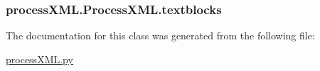 \subsubsection[{textblocks}]{\setlength{\rightskip}{0pt plus 5cm}process\+X\+M\+L.\+Process\+X\+M\+L.\+textblocks}\label{classprocess_x_m_l_1_1_process_x_m_l_aef1a420c84937ecbe7eb76e5c99445f8}


The documentation for this class was generated from the following file\+:\begin{DoxyCompactItemize}
\item 
\hyperlink{process_x_m_l_8py}{process\+X\+M\+L.\+py}\end{DoxyCompactItemize}
